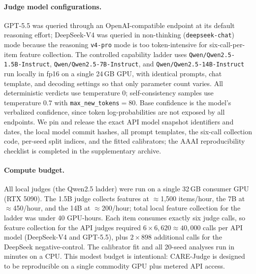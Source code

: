 \paragraph{Judge model configurations.}
GPT-5.5 was queried through an OpenAI-compatible endpoint at its default reasoning effort; DeepSeek-V4 was queried in non-thinking (\texttt{deepseek-chat}) mode because the reasoning \texttt{v4-pro} mode is too token-intensive for six-call-per-item feature collection. The controlled capability ladder uses \texttt{Qwen/Qwen2.5-1.5B-Instruct}, \texttt{Qwen/Qwen2.5-7B-Instruct}, and \texttt{Qwen/Qwen2.5-14B-Instruct} run locally in fp16 on a single 24\,GB GPU, with identical prompts, chat template, and decoding settings so that only parameter count varies. All deterministic verdicts use temperature $0$; self-consistency samples use temperature $0.7$ with \texttt{max\_new\_tokens}$=80$. Base confidence is the model's verbalized confidence, since token log-probabilities are not exposed by all endpoints. We pin and release the exact API model snapshot identifiers and dates, the local model commit hashes, all prompt templates, the six-call collection code, per-seed split indices, and the fitted calibrators; the AAAI reproducibility checklist is completed in the supplementary archive.

\paragraph{Compute budget.}
All local judges (the Qwen2.5 ladder) were run on a single 32\,GB consumer GPU (RTX 5090). The 1.5B judge collects features at $\approx$1{,}500 items/hour, the 7B at $\approx$450/hour, and the 14B at $\approx$200/hour; total local feature collection for the ladder was under 40 GPU-hours. Each item consumes exactly six judge calls, so feature collection for the API judges required $6\times6{,}620\approx40{,}000$ calls per API model (DeepSeek-V4 and GPT-5.5), plus $2\times898$ additional calls for the DeepSeek negative-control. The calibrator fit and all 20-seed analyses run in minutes on a CPU. This modest budget is intentional: CARE-Judge is designed to be reproducible on a single commodity GPU plus metered API access.

